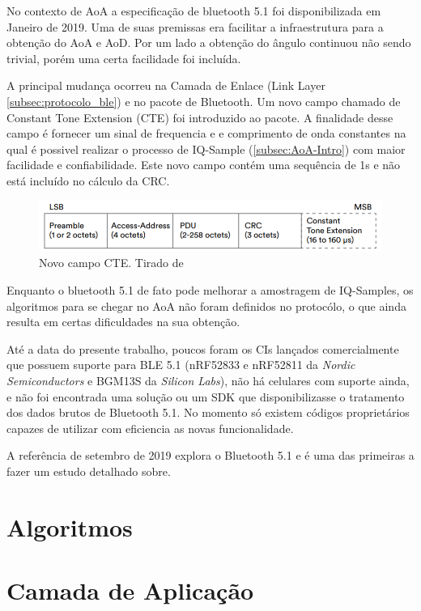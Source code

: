 No contexto de AoA a especificação de bluetooth 5.1 foi disponibilizada em Janeiro de 2019. Uma de suas premissas era facilitar a infraestrutura para a obtenção do AoA e AoD. Por um lado a obtenção do ângulo continuou não sendo trivial, porém uma certa facilidade foi incluída.

A principal mudança ocorreu na Camada de Enlace (Link Layer \ref{subsec:protocolo_ble}) e no pacote de Bluetooth. Um novo campo chamado de Constant Tone Extension (CTE) foi introduzido ao pacote. A finalidade desse campo é fornecer um sinal de frequencia e e comprimento de onda constantes na qual é possivel realizar o processo de IQ-Sample (\ref{subsec:AoA-Intro}) com maior facilidade e confiabilidade. Este novo campo contém uma sequência de 1s e não está incluído no cálculo da CRC.

\begin{figure}[H]
	\centering
	\includegraphics[width=1.0\textwidth]{images/cte-ble.png}
	\caption{Novo campo CTE. Tirado de \cite{Bluetooth_SIG_Site} }
	\label{fig:cte-ble}
\end{figure}

Enquanto o bluetooth 5.1 de fato pode melhorar a amostragem de IQ-Samples, os algoritmos para se chegar no AoA não foram definidos no protocólo, o que ainda resulta em certas dificuldades na sua obtenção.

Até a data do presente trabalho, poucos foram os CIs lançados comercialmente que possuem suporte para BLE 5.1 (nRF52833 e nRF52811 da \textit{Nordic Semiconductors} e BGM13S da \textit{Silicon Labs}), não há celulares com suporte ainda, e não foi encontrada uma solução ou um SDK que disponibilizasse o tratamento dos dados brutos de Bluetooth 5.1. No momento só existem códigos proprietários capazes de utilizar com eficiencia as novas funcionalidade.

A referência \cite{art21} de setembro de 2019 explora o Bluetooth 5.1 e é uma das primeiras a fazer um estudo detalhado sobre.


\section{Algoritmos}


\section{Camada de Aplicação}

